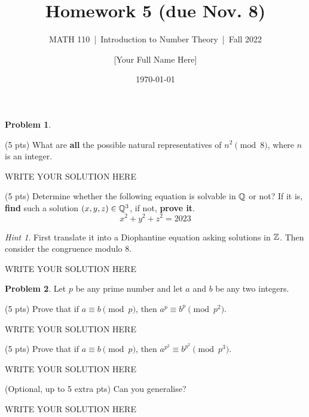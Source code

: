 \documentclass[11pt]{article}
\title{Homework 5 (due Nov. 8)}
\author{[Your Full Name Here]}
\subtitle{MATH 110~|~Introduction to Number Theory~|~Fall 2022}
\date{\today}
\theoremstyle{plain}
\theoremstyle{definition}
\newtheorem{problem}{Problem}
\theoremstyle{remark}
\newtheorem*{hint}{Hint}
\numberwithin{equation}{problem}
\begin{document}
\maketitle

\begin{problem}
	\begin{listinprob}
		\item	(5 pts) What are \textbf{all} the possible natural representatives of $n^2\pmod 8$, where $n$ is an integer.
\begin{solution} %
WRITE YOUR SOLUTION HERE
\end{solution}\clearpage %

		\item (5 pts) Determine whether the following equation is solvable in $\mathbb{Q}$ or not? If it is, \textbf{find} such a solution $(x,y,z)\in\mathbb{Q}^3$, if not, \textbf{prove it}.
		\[
			x^2+y^2+z^2=2023
		\] 
		\begin{hint}
			First translate it into a Diophantine equation asking solutions in $\mathbb{Z}$. Then consider the congruence modulo $8$. 
		\end{hint}
	\end{listinprob}	
\end{problem}
\begin{solution} %
WRITE YOUR SOLUTION HERE
\end{solution}\clearpage %

\begin{problem}
	Let $p$ be any prime number and let $a$ and $b$ be any two integers.
	\begin{listinprob}
	\item (5 pts) Prove that if $a \equiv b \pmod{p}$, then $a^p \equiv b^p \pmod{p^2}$.
\begin{solution} %
WRITE YOUR SOLUTION HERE
\end{solution}\clearpage %

	\item (5 pts) Prove that if $a \equiv b \pmod{p}$, then $a^{p^2} \equiv b^{p^2} \pmod{p^3}$.
\begin{solution} %
WRITE YOUR SOLUTION HERE
\end{solution}\clearpage %

	\item (Optional, up to 5 extra pts) Can you generalise?
	\end{listinprob}
\end{problem}
\begin{solution} %
WRITE YOUR SOLUTION HERE
\end{solution}\clearpage %
\end{document}
